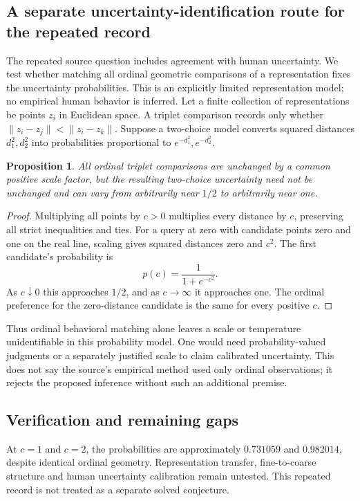 \documentclass[11pt]{article}
\newtheorem{proposition}{Proposition}
\begin{document}
\subsection{A separate uncertainty-identification route for the repeated record}
The repeated source question includes agreement with human uncertainty. We test whether matching all ordinal geometric comparisons of a representation fixes the uncertainty probabilities. This is an explicitly limited representation model; no empirical human behavior is inferred.
Let a finite collection of representations be points $z_i$ in Euclidean space. A triplet comparison records only whether $\|z_i-z_j\|<\|z_i-z_k\|$. Suppose a two-choice model converts squared distances $d_1^2,d_2^2$ into probabilities proportional to $e^{-d_1^2},e^{-d_2^2}$.
\begin{proposition}
All ordinal triplet comparisons are unchanged by a common positive scale factor, but the resulting two-choice uncertainty need not be unchanged and can vary from arbitrarily near $1/2$ to arbitrarily near one.
\end{proposition}
\begin{proof}
Multiplying all points by $c>0$ multiplies every distance by $c$, preserving all strict inequalities and ties. For a query at zero with candidate points zero and one on the real line, scaling gives squared distances zero and $c^2$. The first candidate's probability is
\[
 p(c)=\frac1{1+e^{-c^2}}.
\]
As $c\downarrow0$ this approaches $1/2$, and as $c\to\infty$ it approaches one. The ordinal preference for the zero-distance candidate is the same for every positive $c$.
\end{proof}
Thus ordinal behavioral matching alone leaves a scale or temperature unidentifiable in this probability model. One would need probability-valued judgments or a separately justified scale to claim calibrated uncertainty. This does not say the source's empirical method used only ordinal observations; it rejects the proposed inference without such an additional premise.
\subsection{Verification and remaining gaps}
At $c=1$ and $c=2$, the probabilities are approximately $0.731059$ and $0.982014$, despite identical ordinal geometry. Representation transfer, fine-to-coarse structure and human uncertainty calibration remain untested. This repeated record is not treated as a separate solved conjecture.
\end{document}
